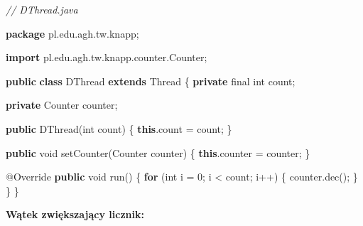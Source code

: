 \documentclass[11pt]{article}
\newenvironment{Shaded}{}{}
\newcommand{\KeywordTok}[1]{\textcolor[rgb]{0.00,0.44,0.13}{\textbf{{#1}}}}
\newcommand{\DataTypeTok}[1]{\textcolor[rgb]{0.56,0.13,0.00}{{#1}}}
\newcommand{\DecValTok}[1]{\textcolor[rgb]{0.25,0.63,0.44}{{#1}}}
\newcommand{\CommentTok}[1]{\textcolor[rgb]{0.38,0.63,0.69}{\textit{{#1}}}}
\newcommand{\FunctionTok}[1]{\textcolor[rgb]{0.02,0.16,0.49}{{#1}}}
\newcommand{\NormalTok}[1]{{#1}}
\newcommand{\ImportTok}[1]{{#1}}
\newcommand{\ControlFlowTok}[1]{\textcolor[rgb]{0.00,0.44,0.13}{\textbf{{#1}}}}
\newcommand{\OperatorTok}[1]{\textcolor[rgb]{0.40,0.40,0.40}{{#1}}}
\newcommand{\BuiltInTok}[1]{{#1}}
\newcommand{\AttributeTok}[1]{\textcolor[rgb]{0.49,0.56,0.16}{{#1}}}
\begin{document}
\begin{Shaded}
\begin{Highlighting}[]
\CommentTok{// DThread.java}

\KeywordTok{package}\ImportTok{ pl}\OperatorTok{.}\ImportTok{edu}\OperatorTok{.}\ImportTok{agh}\OperatorTok{.}\ImportTok{tw}\OperatorTok{.}\ImportTok{knapp}\OperatorTok{;}

\KeywordTok{import} \ImportTok{pl}\OperatorTok{.}\ImportTok{edu}\OperatorTok{.}\ImportTok{agh}\OperatorTok{.}\ImportTok{tw}\OperatorTok{.}\ImportTok{knapp}\OperatorTok{.}\ImportTok{counter}\OperatorTok{.}\ImportTok{Counter}\OperatorTok{;}

\KeywordTok{public} \KeywordTok{class}\NormalTok{ DThread }\KeywordTok{extends} \BuiltInTok{Thread} \OperatorTok{\{}
    \KeywordTok{private} \DataTypeTok{final} \DataTypeTok{int}\NormalTok{ count}\OperatorTok{;}

    \KeywordTok{private}\NormalTok{ Counter counter}\OperatorTok{;}

    \KeywordTok{public} \FunctionTok{DThread}\OperatorTok{(}\DataTypeTok{int}\NormalTok{ count}\OperatorTok{)} \OperatorTok{\{}
        \KeywordTok{this}\OperatorTok{.}\FunctionTok{count} \OperatorTok{=}\NormalTok{ count}\OperatorTok{;}
    \OperatorTok{\}}

    \KeywordTok{public} \DataTypeTok{void} \FunctionTok{setCounter}\OperatorTok{(}\NormalTok{Counter counter}\OperatorTok{)} \OperatorTok{\{}
        \KeywordTok{this}\OperatorTok{.}\FunctionTok{counter} \OperatorTok{=}\NormalTok{ counter}\OperatorTok{;}
    \OperatorTok{\}}

    \AttributeTok{@Override}
    \KeywordTok{public} \DataTypeTok{void} \FunctionTok{run}\OperatorTok{()} \OperatorTok{\{}
        \ControlFlowTok{for} \OperatorTok{(}\DataTypeTok{int}\NormalTok{ i }\OperatorTok{=} \DecValTok{0}\OperatorTok{;}\NormalTok{ i }\OperatorTok{\textless{}}\NormalTok{ count}\OperatorTok{;}\NormalTok{ i}\OperatorTok{++)} \OperatorTok{\{}
\NormalTok{            counter}\OperatorTok{.}\FunctionTok{dec}\OperatorTok{();}
        \OperatorTok{\}}
    \OperatorTok{\}}
\OperatorTok{\}}
\end{Highlighting}
\end{Shaded}

\textbf{Wątek zwiększający licznik:}
\end{document}
